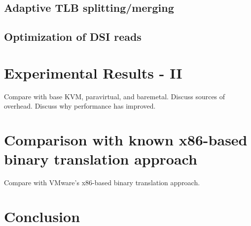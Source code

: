 \documentclass[10pt,twocolumn]{article}
\begin{document}
\subsection{Adaptive TLB splitting/merging}
\subsection{Optimization of DSI reads}

\section{Experimental Results - II}
Compare with base KVM, paravirtual, and baremetal. Discuss sources of overhead. Discuss
why performance has improved.

\section{Comparison with known x86-based binary translation approach}
Compare with VMware's x86-based binary translation approach.

\section{Conclusion}



\end{document}
